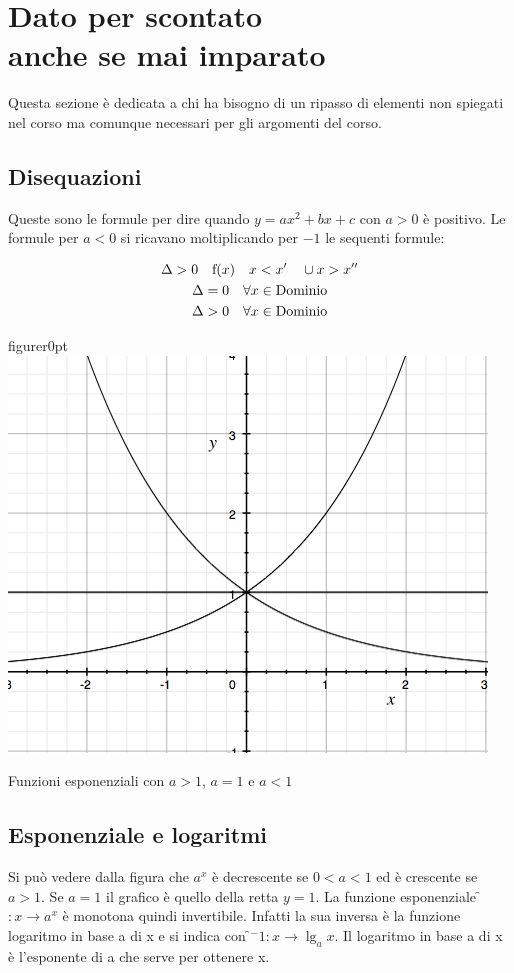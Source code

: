 \section{Dato per scontato\\ anche se mai imparato}
Questa sezione è dedicata a chi ha bisogno di un ripasso di elementi non spiegati nel corso ma comunque necessari per gli argomenti del corso.
\subsection{Disequazioni}
 Queste sono le formule per dire quando $y=ax^2+bx+c$ con $a>0$ è positivo. Le formule per $a<0$ si ricavano moltiplicando per $-1$ le sequenti formule:
 
 \begin{gather*}
 \Delta>0 \quad \text{f} (x)\quad x<x'\quad \cup x>x''\\
 \Delta=0 \quad \forall x \in \text{Dominio}\\
 \Delta>0 \quad \forall x \in \text{Dominio}\\
 \end{gather*}

\begin{wrapfloat}{figure}{r}{0pt}
\includegraphics[width=0.5\columnwidth]{Esponenziale}
\caption{Funzioni esponenziali con $a>1$, $a=1$ e $a<1$}
\end{wrapfloat}

\subsection{Esponenziale e logaritmi}

Si può vedere dalla figura che $a^x$ è decrescente se $0<a<1$ ed è crescente se $a>1$. Se $a=1$ il grafico è quello della retta $y=1$.
La funzione esponenziale \f$:x\to a^x$ è monotona quindi invertibile. Infatti la sua inversa è la funzione logaritmo in base a di x e si indica con \f$^-1 :x \to \lg_a x$.
Il logaritmo in base a di x è l'esponente di a che serve per ottenere x.\\
 \newline
